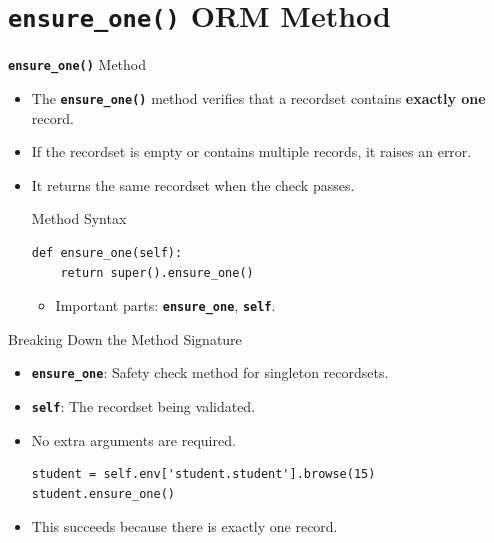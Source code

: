 
\section{\textbf{\texttt{ensure\_one()}} ORM Method}

\begin{frame}[fragile]{\textbf{\texttt{ensure\_one()}} Method}
	\begin{itemize}
		\item The \textbf{\texttt{ensure\_one()}} method verifies that a recordset contains \textbf{exactly one} record.
		\item If the recordset is empty or contains multiple records, it raises an error.
		\item It returns the same recordset when the check passes.
\begin{block}{Method Syntax}
\begin{lstlisting}
def ensure_one(self):
	return super().ensure_one()
\end{lstlisting}
	\begin{itemize}
		\item Important parts: \textbf{\texttt{ensure\_one}}, \textbf{\texttt{self}}.
	\end{itemize}
\end{block}
	\end{itemize}
\end{frame}

\begin{frame}[fragile]{Breaking Down the Method Signature}
	\begin{block}{}
		\begin{itemize}
			\item \textbf{\texttt{ensure\_one}}: Safety check method for singleton recordsets.
			\item \textbf{\texttt{self}}: The recordset being validated.
			\item No extra arguments are required.
\begin{lstlisting}
student = self.env['student.student'].browse(15)
student.ensure_one()
\end{lstlisting}
			\item This succeeds because there is exactly one record.
		\end{itemize}
	\end{block}
\end{frame}

